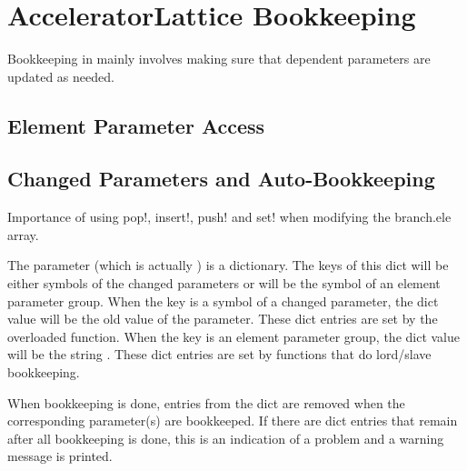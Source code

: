 \chapter{AcceleratorLattice Bookkeeping}
\label{c:bookkeeping}

Bookkeeping in \accellat mainly involves making sure that dependent parameters are updated as needed.

\section{Element Parameter Access}
\label{s:access}

\section{Changed Parameters and Auto-Bookkeeping}
\label{s:changed.param}

Importance of using pop!, insert!, push! and set! when modifying the branch.ele array.

The  parameter (which is actually ) is a dictionary.
The keys of this dict will be either symbols of the changed parameters or
will be the symbol of an element parameter group. 
When the key is a symbol of a changed parameter,
the dict value will be the old value of the parameter. These dict entries are set by the 
overloaded  function. 
When the key is an element parameter group, the dict value will be the string .
These dict entries are set by functions that do lord/slave bookkeeping.

When bookkeeping is done, entries from the  dict are removed when the corresponding
parameter(s) are bookkeeped. If there are dict entries that remain after all bookkeeping is done,
this is an indication of a problem and a warning message is printed.

